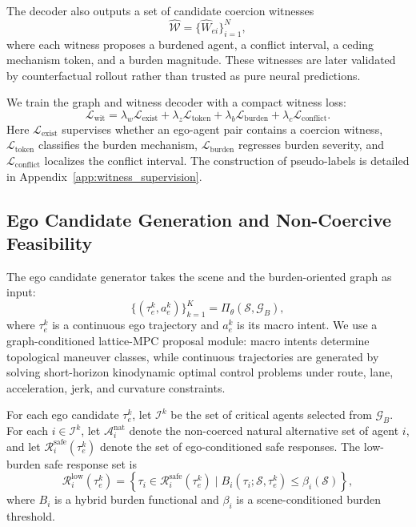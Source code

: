 \documentclass[10pt]{article}
\begin{document}
The decoder also outputs a set of candidate coercion witnesses
\begin{equation}
    \widehat{\mathcal{W}} =
    \{ \widehat{W}_{ei} \}_{i=1}^{N},
\end{equation}
where each witness proposes a burdened agent, a conflict interval, a ceding mechanism token, and a burden magnitude. These witnesses are later validated by counterfactual rollout rather than trusted as pure neural predictions.

We train the graph and witness decoder with a compact witness loss:
\begin{equation}
    \mathcal{L}_{\mathrm{wit}}
    =
    \lambda_w \mathcal{L}_{\mathrm{exist}}
    +
    \lambda_z \mathcal{L}_{\mathrm{token}}
    +
    \lambda_b \mathcal{L}_{\mathrm{burden}}
    +
    \lambda_c \mathcal{L}_{\mathrm{conflict}} .
\end{equation}
Here $\mathcal{L}_{\mathrm{exist}}$ supervises whether an ego-agent pair contains a coercion witness, $\mathcal{L}_{\mathrm{token}}$ classifies the burden mechanism, $\mathcal{L}_{\mathrm{burden}}$ regresses burden severity, and $\mathcal{L}_{\mathrm{conflict}}$ localizes the conflict interval. The construction of pseudo-labels is detailed in Appendix~\ref{app:witness_supervision}.

\subsection{Ego Candidate Generation and Non-Coercive Feasibility}
\label{sec:method_candidate}

The ego candidate generator takes the scene and the burden-oriented graph as input:
\begin{equation}
    \{(\tau^k_e, a^k_e)\}_{k=1}^{K}
    =
    \Pi_{\theta}(\mathcal{S}, \mathcal{G}_B),
\end{equation}
where $\tau^k_e$ is a continuous ego trajectory and $a^k_e$ is its macro intent. We use a graph-conditioned lattice-MPC proposal module: macro intents determine topological maneuver classes, while continuous trajectories are generated by solving short-horizon kinodynamic optimal control problems under route, lane, acceleration, jerk, and curvature constraints. 

For each ego candidate $\tau^k_e$, let $\mathcal{I}^k$ be the set of critical agents selected from $\mathcal{G}_B$. For each $i\in\mathcal{I}^k$, let $\mathcal{A}^{\mathrm{nat}}_i$ denote the non-coerced natural alternative set of agent $i$, and let $\mathcal{R}^{\mathrm{safe}}_i(\tau^k_e)$ denote the set of ego-conditioned safe responses. The low-burden safe response set is
\begin{equation}
    \mathcal{R}^{\mathrm{low}}_i(\tau^k_e)
    =
    \left\{
    \tau_i \in \mathcal{R}^{\mathrm{safe}}_i(\tau^k_e)
    \mid
    B_i(\tau_i;\mathcal{S},\tau^k_e)
    \le
    \beta_i(\mathcal{S})
    \right\},
\end{equation}
where $B_i$ is a hybrid burden functional and $\beta_i$ is a scene-conditioned burden threshold.
\end{document}

